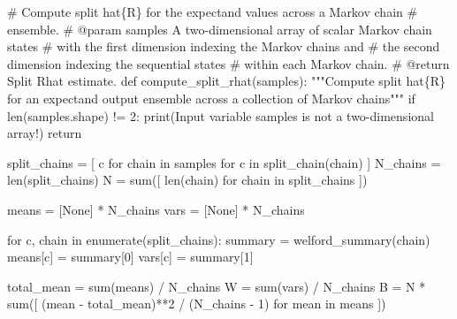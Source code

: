 \documentclass[
  letterpaper,
  DIV=11,
  numbers=noendperiod]{scrartcl}
\newenvironment{Shaded}{\begin{snugshade}}{\end{snugshade}}
\newcommand{\BuiltInTok}[1]{\textcolor[rgb]{0.00,0.23,0.31}{#1}}
\newcommand{\CommentTok}[1]{\textcolor[rgb]{0.37,0.37,0.37}{#1}}
\newcommand{\ControlFlowTok}[1]{\textcolor[rgb]{0.00,0.23,0.31}{#1}}
\newcommand{\DecValTok}[1]{\textcolor[rgb]{0.68,0.00,0.00}{#1}}
\newcommand{\KeywordTok}[1]{\textcolor[rgb]{0.00,0.23,0.31}{#1}}
\newcommand{\NormalTok}[1]{\textcolor[rgb]{0.00,0.23,0.31}{#1}}
\newcommand{\OperatorTok}[1]{\textcolor[rgb]{0.37,0.37,0.37}{#1}}
\newcommand{\StringTok}[1]{\textcolor[rgb]{0.13,0.47,0.30}{#1}}
\newcommand{\VariableTok}[1]{\textcolor[rgb]{0.07,0.07,0.07}{#1}}
\begin{document}
\begin{Shaded}
\begin{Highlighting}[]
\CommentTok{\# Compute split hat\{R\} for the expectand values across a Markov chain }
\CommentTok{\# ensemble.}
\CommentTok{\# @param samples A two{-}dimensional array of scalar Markov chain states }
\CommentTok{\#                with the first dimension indexing the Markov chains and }
\CommentTok{\#                the second dimension indexing the sequential states }
\CommentTok{\#                within each Markov chain.}
\CommentTok{\# @return Split Rhat estimate.}
\KeywordTok{def}\NormalTok{ compute\_split\_rhat(samples):}
  \CommentTok{"""Compute split hat\{R\} for an expectand output ensemble across}
\CommentTok{     a collection of Markov chains"""}
  \ControlFlowTok{if} \BuiltInTok{len}\NormalTok{(samples.shape) }\OperatorTok{!=} \DecValTok{2}\NormalTok{:}
    \BuiltInTok{print}\NormalTok{(}\StringTok{\textquotesingle{}Input variable \textasciigrave{}samples\textasciigrave{} is not a two{-}dimensional array!\textquotesingle{}}\NormalTok{)}
    \ControlFlowTok{return}
  
\NormalTok{  split\_chains }\OperatorTok{=}\NormalTok{ [ c }\ControlFlowTok{for}\NormalTok{ chain }\KeywordTok{in}\NormalTok{ samples }\ControlFlowTok{for}\NormalTok{ c }\KeywordTok{in}\NormalTok{ split\_chain(chain) ]}
\NormalTok{  N\_chains }\OperatorTok{=} \BuiltInTok{len}\NormalTok{(split\_chains)}
\NormalTok{  N }\OperatorTok{=} \BuiltInTok{sum}\NormalTok{([ }\BuiltInTok{len}\NormalTok{(chain) }\ControlFlowTok{for}\NormalTok{ chain }\KeywordTok{in}\NormalTok{ split\_chains ])}
  
\NormalTok{  means }\OperatorTok{=}\NormalTok{ [}\VariableTok{None}\NormalTok{] }\OperatorTok{*}\NormalTok{ N\_chains}
  \BuiltInTok{vars} \OperatorTok{=}\NormalTok{ [}\VariableTok{None}\NormalTok{] }\OperatorTok{*}\NormalTok{ N\_chains}
  
  \ControlFlowTok{for}\NormalTok{ c, chain }\KeywordTok{in} \BuiltInTok{enumerate}\NormalTok{(split\_chains):}
\NormalTok{    summary }\OperatorTok{=}\NormalTok{ welford\_summary(chain)}
\NormalTok{    means[c] }\OperatorTok{=}\NormalTok{ summary[}\DecValTok{0}\NormalTok{]}
    \BuiltInTok{vars}\NormalTok{[c] }\OperatorTok{=}\NormalTok{ summary[}\DecValTok{1}\NormalTok{]}
  
\NormalTok{  total\_mean }\OperatorTok{=} \BuiltInTok{sum}\NormalTok{(means) }\OperatorTok{/}\NormalTok{ N\_chains}
\NormalTok{  W }\OperatorTok{=} \BuiltInTok{sum}\NormalTok{(}\BuiltInTok{vars}\NormalTok{) }\OperatorTok{/}\NormalTok{ N\_chains}
\NormalTok{  B }\OperatorTok{=}\NormalTok{ N }\OperatorTok{*} \BuiltInTok{sum}\NormalTok{([ (mean }\OperatorTok{{-}}\NormalTok{ total\_mean)}\OperatorTok{**}\DecValTok{2} \OperatorTok{/}\NormalTok{ (N\_chains }\OperatorTok{{-}} \DecValTok{1}\NormalTok{) }
                \ControlFlowTok{for}\NormalTok{ mean }\KeywordTok{in}\NormalTok{ means ])}
  

\end{Highlighting}
\end{Shaded}
\end{document}
